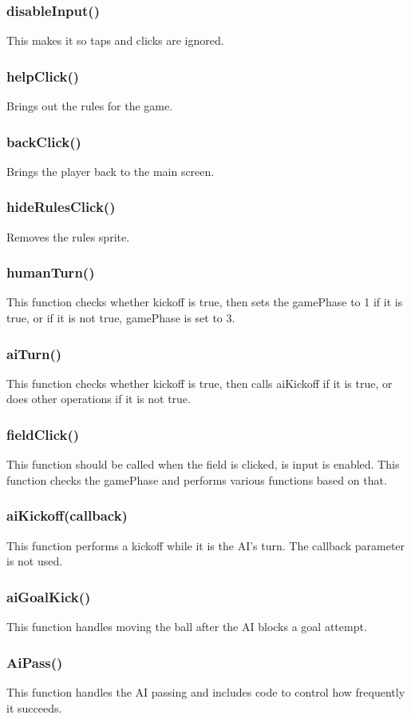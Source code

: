 \documentclass[12pt]{article}
\begin{document}
\subsubsection*{disableInput()}
This makes it so taps and clicks are ignored. 
\subsubsection*{helpClick()}
Brings out the rules for the game. 
\subsubsection*{backClick()}
Brings the player back to the main screen. 
\subsubsection*{hideRulesClick()}
Removes the rules sprite. 
\subsubsection*{humanTurn()}
This function checks whether kickoff is true, then sets the gamePhase
to 1 if it is true, or  if it is not true, gamePhase is set to 3. 
\subsubsection*{aiTurn()}
This function checks whether kickoff is true, then calls aiKickoff if
it is true, or does other operations if it is not true. 
\subsubsection*{fieldClick()}
This function should be called when the field is clicked, is input
is enabled. This function checks the gamePhase and performs various
functions based on that. 
\subsubsection*{aiKickoff(callback)}
This function performs a kickoff while it is the AI's turn. 
The callback parameter is not used. 
\subsubsection*{aiGoalKick()}
This function handles moving the ball after the AI blocks a goal
attempt.
\subsubsection*{AiPass()}
This function handles the AI passing and includes code to control how 
frequently it succeeds. 
\end{document}
